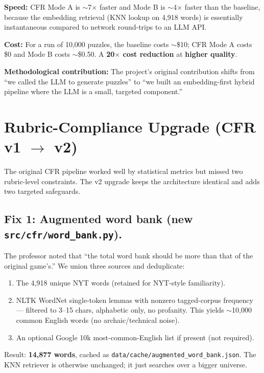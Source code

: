 \documentclass[11pt, letterpaper]{article}
\begin{document}
\textbf{Speed:} CFR Mode A is $\sim$7$\times$ faster and Mode B is $\sim$4$\times$ faster
than the baseline, because the embedding retrieval (KNN lookup on 4,918 words) is
essentially instantaneous compared to network round-trips to an LLM API.

\textbf{Cost:} For a run of 10{,}000 puzzles, the baseline costs $\sim$\$10; CFR Mode A
costs \$0 and Mode B costs $\sim$\$0.50. A \textbf{20$\times$ cost reduction} at
\textbf{higher quality}.

\textbf{Methodological contribution:} The project's original contribution shifts from
``we called the LLM to generate puzzles'' to ``we built an embedding-first hybrid
pipeline where the LLM is a small, targeted component.''

\section{Rubric-Compliance Upgrade (CFR v1 $\rightarrow$ v2)}

The original CFR pipeline worked well by statistical metrics but missed two
rubric-level constraints. The v2 upgrade keeps the architecture identical and adds
two targeted safeguards.

\subsection*{Fix 1: Augmented word bank (new \texttt{src/cfr/word\_bank.py}).}

The professor noted that ``the total word bank should be more than that of the original
game's.'' We union three sources and deduplicate:

\begin{enumerate}[leftmargin=*, itemsep=0.1em]
\item The 4{,}918 unique NYT words (retained for NYT-style familiarity).
\item NLTK WordNet single-token lemmas with nonzero tagged-corpus frequency --- filtered
to 3--15 chars, alphabetic only, no profanity. This yields $\sim$10{,}000 common
English words (no archaic/technical noise).
\item An optional Google 10k most-common-English list if present (not required).
\end{enumerate}

Result: \textbf{14{,}877 words}, cached as \texttt{data/cache/augmented\_word\_bank.json}.
The KNN retriever is otherwise unchanged; it just searches over a bigger universe.
\end{document}
